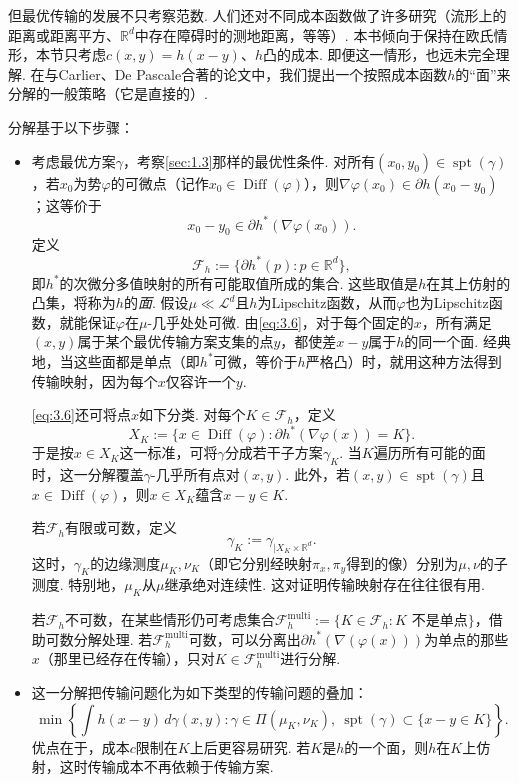 但最优传输的发展不只考察范数. 人们还对不同成本函数做了许多研究（流形上的距离或距离平方、$\mathbb R^d$中存在障碍时的测地距离，等等）. 本书倾向于保持在欧氏情形，本节只考虑$c(x,y)=h(x-y)$、$h$凸的成本. 即便这一情形，也远未完全理解. 在与Carlier、De Pascale合著的论文\cite{b113}中，我们提出一个按照成本函数$h$的“面”来分解的一般策略（它是直接的）.

分解基于以下步骤：
\begin{itemize}
\item 考虑最优方案$\gamma$，考察\autoref{sec:1.3}那样的最优性条件. 对所有$(x_0,y_0)\in\operatorname{spt}(\gamma)$，若$x_0$为势$\varphi$的可微点（记作$x_0\in\operatorname{Diff}(\varphi)$），则$\nabla\varphi(x_0)\in\partial h(x_0-y_0)$；这等价于
\begin{equation}\label{eq:3.6}
x_0-y_0\in\partial h^*(\nabla\varphi(x_0)).
\end{equation}
定义
\[
\mathscr F_h:=\{\partial h^*(p):p\in\mathbb R^d\},
\]
即$h^*$的次微分多值映射的所有可能取值所成的集合. 这些取值是$h$在其上仿射的凸集，将称为$h$的\emph{面}. 假设$\mu\ll\mathscr L^d$且$h$为Lipschitz函数，从而$\varphi$也为Lipschitz函数，就能保证$\varphi$在$\mu$-几乎处处可微. 由\eqref{eq:3.6}，对于每个固定的$x$，所有满足$(x,y)$属于某个最优传输方案支集的点$y$，都使差$x-y$属于$h$的同一个面. 经典地，当这些面都是单点（即$h^*$可微，等价于$h$严格凸）时，就用这种方法得到传输映射，因为每个$x$仅容许一个$y$.

\eqref{eq:3.6}还可将点$x$如下分类. 对每个$K\in\mathscr F_h$，定义
\[
X_K:=\{x\in\operatorname{Diff}(\varphi):\partial h^*(\nabla\varphi(x))=K\}.
\]
于是按$x\in X_K$这一标准，可将$\gamma$分成若干子方案$\gamma_K$. 当$K$遍历所有可能的面时，这一分解覆盖$\gamma$-几乎所有点对$(x,y)$. 此外，若$(x,y)\in\operatorname{spt}(\gamma)$且$x\in\operatorname{Diff}(\varphi)$，则$x\in X_K$蕴含$x-y\in K$.

若$\mathscr F_h$有限或可数，定义
\[
\gamma_K:=\gamma_{|X_K\times\mathbb R^d}.
\]
这时，$\gamma_K$的边缘测度$\mu_K,\nu_K$（即它分别经映射$\pi_x,\pi_y$得到的像）分别为$\mu,\nu$的子测度. 特别地，$\mu_K$从$\mu$继承绝对连续性. 这对证明传输映射存在往往很有用.

若$\mathscr F_h$不可数，在某些情形仍可考虑集合$\mathscr F_h^{\mathrm{multi}}:=\{K\in\mathscr F_h:K\text{ 不是单点}\}$，借助可数分解处理. 若$\mathscr F_h^{\mathrm{multi}}$可数，可以分离出$\partial h^*(\nabla(\varphi(x)))$为单点的那些$x$（那里已经存在传输），只对$K\in\mathscr F_h^{\mathrm{multi}}$进行分解.

\item 这一分解把传输问题化为如下类型的传输问题的叠加：
\[
\min\left\{\int h(x-y)\,d\gamma(x,y):\gamma\in\Pi(\mu_K,\nu_K),\ \operatorname{spt}(\gamma)\subset\{x-y\in K\}\right\}.
\]
优点在于，成本$c$限制在$K$上后更容易研究. 若$K$是$h$的一个面，则$h$在$K$上仿射，这时传输成本不再依赖于传输方案.


\end{itemize}
